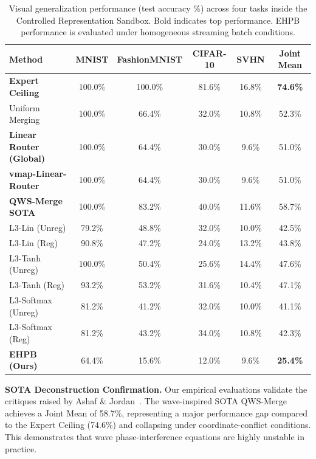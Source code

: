 \begin{table}[t]
\caption{Visual generalization performance (test accuracy \%) across four tasks inside the Controlled Representation Sandbox. Bold indicates top performance. EHPB performance is evaluated under homogeneous streaming batch conditions.}
\label{tab:sandbox_performance}
\vskip 0.15in
\begin{center}
\begin{small}
\begin{sc}
\begin{tabular}{lccccc}
\toprule
Method & MNIST & FashionMNIST & CIFAR-10 & SVHN & Joint Mean \\
\midrule
\textbf{Expert Ceiling} & 100.0\% & 100.0\% & 81.6\% & 16.8\% & \textbf{74.6\%} \\
Uniform Merging & 100.0\% & 66.4\% & 32.0\% & 10.8\% & 52.3\% \\
\textbf{Linear Router (Global)} & 100.0\% & 64.4\% & 30.0\% & 9.6\% & 51.0\% \\
\textbf{vmap-Linear-Router} & 100.0\% & 64.4\% & 30.0\% & 9.6\% & 51.0\% \\
\textbf{QWS-Merge SOTA} & 100.0\% & 83.2\% & 40.0\% & 11.6\% & 58.7\% \\
L3-Lin (Unreg) & 79.2\% & 48.8\% & 32.0\% & 10.0\% & 42.5\% \\
L3-Lin (Reg) & 90.8\% & 47.2\% & 24.0\% & 13.2\% & 43.8\% \\
L3-Tanh (Unreg) & 100.0\% & 50.4\% & 25.6\% & 14.4\% & 47.6\% \\
L3-Tanh (Reg) & 93.2\% & 53.2\% & 31.6\% & 10.4\% & 47.1\% \\
L3-Softmax (Unreg) & 81.2\% & 41.2\% & 32.0\% & 10.0\% & 41.1\% \\
L3-Softmax (Reg) & 81.2\% & 43.2\% & 34.0\% & 10.8\% & 42.3\% \\
\midrule
\textbf{EHPB (Ours)} & 64.4\% & 15.6\% & 12.0\% & 9.6\% & \textbf{25.4\%} \\
\bottomrule
\end{tabular}
\end{sc}
\end{small}
\end{center}
\vskip -0.1in
\end{table}

\textbf{SOTA Deconstruction Confirmation.} Our empirical evaluations validate the critiques raised by Ashaf \& Jordan~\cite{ashaf2024overengineered}. The wave-inspired SOTA QWS-Merge achieves a Joint Mean of 58.7\%, representing a major performance gap compared to the Expert Ceiling (74.6\%) and collapsing under coordinate-conflict conditions. This demonstrates that wave phase-interference equations are highly unstable in practice.

